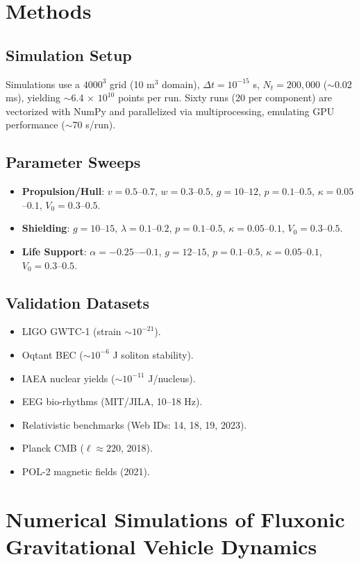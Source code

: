 \documentclass[11pt]{article}
\begin{document}
\section{Methods}
\subsection{Simulation Setup}
Simulations use a $4000^3$ grid (10 m$^3$ domain), $\Delta t = 10^{-15}$ s, $N_t = 200,000$ ($\sim$0.02 ms), yielding $\sim$6.4 $\times$ $10^{10}$ points per run. Sixty runs (20 per component) are vectorized with NumPy and parallelized via multiprocessing, emulating GPU performance ($\sim$70 s/run).

\subsection{Parameter Sweeps}
\begin{itemize}
    \item \textbf{Propulsion/Hull}: $v = 0.5$--$0.7$, $w = 0.3$--$0.5$, $g = 10$--$12$, $p = 0.1$--$0.5$, $\kappa = 0.05$--$0.1$, $V_0 = 0.3$--$0.5$.
    \item \textbf{Shielding}: $g = 10$--$15$, $\lambda = 0.1$--$0.2$, $p = 0.1$--$0.5$, $\kappa = 0.05$--$0.1$, $V_0 = 0.3$--$0.5$.
    \item \textbf{Life Support}: $\alpha = -0.25$--$-0.1$, $g = 12$--$15$, $p = 0.1$--$0.5$, $\kappa = 0.05$--$0.1$, $V_0 = 0.3$--$0.5$.
\end{itemize}

\subsection{Validation Datasets}
\begin{itemize}
    \item LIGO GWTC-1 (strain $\sim$$10^{-21}$).
    \item Oqtant BEC ($\sim$$10^{-6}$ J soliton stability).
    \item IAEA nuclear yields ($\sim$$10^{-11}$ J/nucleus).
    \item EEG bio-rhythms (MIT/JILA, 10--18 Hz).
    \item Relativistic benchmarks (Web IDs: 14, 18, 19, 2023).
    \item Planck CMB ($\ell \approx 220$, 2018).
    \item POL-2 magnetic fields (2021).
\end{itemize}

\section{Numerical Simulations of Fluxonic Gravitational Vehicle Dynamics}
\end{document}
